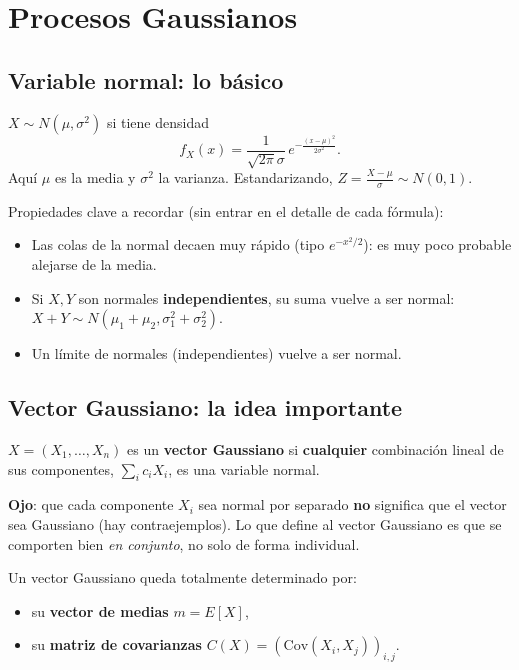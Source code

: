 \documentclass[10pt]{book}
\begin{document}
\chapter{Procesos Gaussianos}

\section{Variable normal: lo básico}

\begin{definicion}
$X\sim N(\mu,\sigma^2)$ si tiene densidad
\begin{equation*}
    f_X(x) = \frac{1}{\sqrt{2\pi}\sigma}\, e^{-\frac{(x-\mu)^2}{2\sigma^2}}.
\end{equation*}
Aquí $\mu$ es la media y $\sigma^2$ la varianza. Estandarizando, $Z=\frac{X-\mu}{\sigma}\sim N(0,1)$.
\end{definicion}

\noindent
Propiedades clave a recordar (sin entrar en el detalle de cada fórmula):
\begin{itemize}
    \item Las colas de la normal decaen muy rápido (tipo $e^{-x^2/2}$): es muy poco probable alejarse de la media.
    \item Si $X,Y$ son normales \textbf{independientes}, su suma vuelve a ser normal: $X+Y\sim N(\mu_1+\mu_2,\sigma_1^2+\sigma_2^2)$.
    \item Un límite de normales (independientes) vuelve a ser normal.
\end{itemize}

\section{Vector Gaussiano: la idea importante}

\begin{definicion}
$X=(X_1,\dots,X_n)$ es un \textbf{vector Gaussiano} si \textbf{cualquier} combinación lineal de sus componentes, $\sum_i c_iX_i$, es una variable normal.
\end{definicion}

\begin{observacion}
\textbf{Ojo}: que cada componente $X_i$ sea normal por separado \textbf{no} significa que el vector sea Gaussiano (hay contraejemplos). Lo que define al vector Gaussiano es que se comporten bien \emph{en conjunto}, no solo de forma individual.
\end{observacion}

\noindent
Un vector Gaussiano queda totalmente determinado por:
\begin{itemize}
    \item su \textbf{vector de medias} $m=E[X]$,
    \item su \textbf{matriz de covarianzas} $C(X)=(\mathrm{Cov}(X_i,X_j))_{i,j}$.
\end{itemize}
\end{document}

